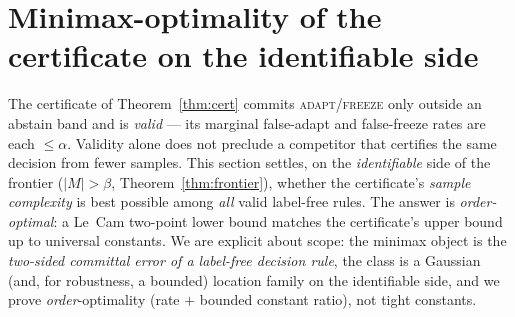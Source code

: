 %
%
\providecommand{\TV}{\mathrm{TV}}
\providecommand{\KL}{\mathrm{KL}}
\section{Minimax-optimality of the certificate on the identifiable side}\label{sec:minimax-opt}

The certificate of Theorem~\ref{thm:cert} commits \textsc{adapt}/\textsc{freeze} only
outside an abstain band and is \emph{valid} --- its marginal false-adapt and false-freeze
rates are each $\le\alpha$. Validity alone does not preclude a competitor that certifies the
same decision from fewer samples. This section settles, on the \emph{identifiable} side of the
frontier ($|M|>\beta$, Theorem~\ref{thm:frontier}), whether the certificate's
\emph{sample complexity} is best possible among \emph{all} valid label-free rules. The answer
is \emph{order-optimal}: a Le~Cam two-point lower bound matches the certificate's upper bound up
to universal constants. We are explicit about scope: the minimax object is the
\emph{two-sided committal error of a label-free decision rule}, the class is a Gaussian (and,
for robustness, a bounded) location family on the identifiable side, and we prove
\emph{order}-optimality (rate $+$ bounded constant ratio), not tight constants.

